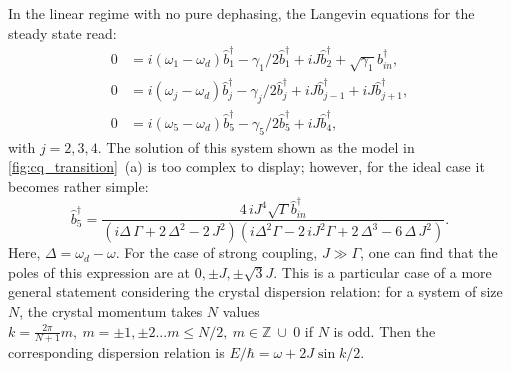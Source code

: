 \documentclass[%
 aps, pra,
 amsmath,amssymb,
 reprint,%
superscriptaddress
]{revtex4-2}
\begin{document}
In the linear regime with no pure dephasing, the Langevin equations for the steady state read:
\begin{equation}
\begin{aligned}
0 &= i(\omega_1 - \omega_d)\hat b_1^\dag - \gamma_1/2 \hat b_1^\dag + i J\hat b_2^\dag + \sqrt{\gamma_1}b_{in}^\dag,\\
0 &= i(\omega_j - \omega_d)\hat b_j^\dag - \gamma_j/2 \hat b_{j}^\dag + i J\hat b_{j-1}^\dag + i J\hat b_{j+1}^\dag,\\
0 &= i(\omega_5 - \omega_d)\hat b_5^\dag - \gamma_5/2 \hat b_5^\dag + i J\hat b_4^\dag,
\end{aligned} 
\end{equation}
with $j = 2,3,4$. The solution of this system shown as the model in \autoref{fig:cq_transition}~(a) is too complex to display; however, for the ideal case it becomes rather simple:
\begin{equation}
\hat b_{{5}}^\dag={\frac {4\,i{J}^{4}\sqrt {\Gamma} \hat b_{in}^\dag}{ \left( i\Delta\,
\Gamma+2\,{\Delta}^{2}-2\,{J}^{2} \right)  \left( i{\Delta}^{2}
\Gamma-2\,i{J}^{2}\Gamma+2\,{\Delta}^{3}-6\,\Delta\,{J}^{2
} \right) }}.
\end{equation}
Here, $\Delta = \omega_d - \omega$. For the case of strong coupling, $J\gg \Gamma$, one can find that the poles of this expression are at $0, \pm J, \pm \sqrt 3 J $. This is a particular case of a more general statement considering the crystal dispersion relation: for a system of size $N$, the crystal momentum takes $N$ values $k = \frac{2 \pi}{N+1} m,\ m=\pm 1, \pm 2... m \leq N/2,\ m\in \mathbb{Z}\  \cup\ {0}$ if $ N $ is odd. Then the corresponding dispersion relation is $E/\hbar = \omega + 2 J \sin k/2$.
\end{document}
